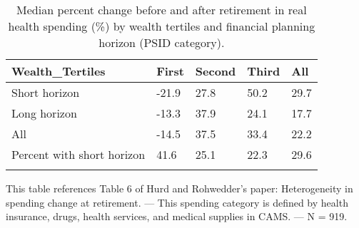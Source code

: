 \begin{table}[tbp] \centering
{}

\caption{Median percent change before and after retirement in real health spending (\%) by wealth tertiles and financial planning horizon (PSID category).}
\begin{tabularx}{\textwidth}{lCCCC}

\toprule
{Wealth\_Tertiles}&{First}&{Second}&{Third}&{All} \tabularnewline
\midrule\addlinespace[1.5ex]
Short horizon&-21.9&27.8&50.2&29.7 \tabularnewline
Long horizon&-13.3&37.9&24.1&17.7 \tabularnewline
All&-14.5&37.5&33.4&22.2 \tabularnewline
Percent with short horizon&41.6&25.1&22.3&29.6 \tabularnewline
\bottomrule \addlinespace[1.5ex]

\end{tabularx}
\begin{flushleft}
\footnotesize This table references Table 6 of Hurd and Rohwedder's paper: Heterogeneity in spending change at retirement. \linebreak --- \linebreak This spending category is defined by health insurance, drugs, health services, and medical supplies in CAMS. \linebreak --- \linebreak N = 919.
\end{flushleft}
\end{table}
